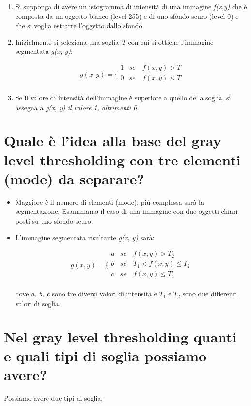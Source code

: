 \begin{enumerate}
\item Si supponga di avere un istogramma di intensità di una immagine \textit{f(x,y)} che è composta da un oggetto bianco (level 255) e di uno sfondo scuro (level 0) e che si voglia estrarre l'oggetto dallo sfondo.

\item Inizialmente si seleziona una soglia \textit{T} con cui si ottiene l'immagine segmentata \textit{g(x, y)}:

$$
g(x, y) =
\bigg \{
\begin{array}{rl}
1 & se \quad f(x, y) > T \\
0 & se \quad f(x, y) \leq T \\
\end{array}
$$

\item Se il valore di intensità dell'immagine è superiore a quello della soglia, si assegna a \textit{g(x, y) il valore 1, altrimenti 0}
\end{enumerate}

\section{Quale è l'idea alla base del gray level thresholding con tre elementi (mode) da separare?}

\begin{itemize}
\item Maggiore è il numero di elementi (mode), più complessa sarà la segmentazione. Esaminiamo il caso di una immagine con due oggetti chiari posti su uno sfondo scuro.

\item L'immagine segmentata risultante \textit{g(x, y)} sarà:

$$
g(x, y) =
\bigg \{
\begin{array}{rl}
a & se \quad f(x, y) > T_2 \\
b & se \quad  T_1 < f(x, y) \leq T_2 \\
c & se \quad f(x, y) \leq T_1 \\
\end{array}
$$

dove \textit{a, b, c} sono tre diversi valori di intensità e $T_1$ e $T_2$ sono due differenti valori di soglia.

\end{itemize}


\section{Nel gray level thresholding quanti e quali tipi di soglia possiamo avere?}
Possiamo avere due tipi di soglia:

